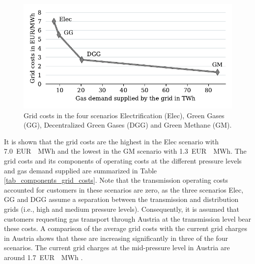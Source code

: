 \begin{figure}[h]
	\centering
	\includegraphics[width=1\linewidth]{figures/results/grid_charges/grid_charges.pdf}
	\caption{Grid costs in the four scenarios Electrification (Elec), Green Gases (GG), Decentralized Green Gases (DGG) and Green Methane (GM).}
	\label{fig_grid_charges}
\end{figure}

It is shown that the grid costs are the highest in the Elec scenario with \SI{7.0}{EUR \per MWh} and the lowest in the GM scenario with \SI{1.3}{EUR \per MWh}. The grid costs and its components of operating costs at the different pressure levels and gas demand supplied are summarized in Table \ref{tab_components_grid_costs}. Note that the transmission operating costs accounted for customers in these scenarios are zero, as the three scenarios Elec, GG and DGG assume a separation between the transmission and distribution grids (i.e., high and medium pressure levels). Consequently, it is assumed that customers requesting gas transport through Austria at the transmission level bear these costs. A comparison of the average grid costs with the current grid charges in Austria shows that these are increasing significantly in three of the four scenarios. The current grid charges at the mid-pressure level in Austria are around \SI{1.7}{EUR \per MWh} \cite{econtrol_gas_charges}.

